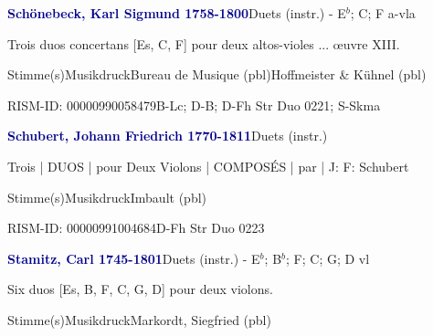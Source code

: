 \documentclass[twocolumn, 12pt]{book}
\begin{document}
\par \vspace{16pt} \textcolor{darkblue}{\textbf{Schönebeck, Karl Sigmund  1758-1800}}\hfillplus{\textbf{[328]}}\newline Duets (instr.) - E$^b$; C; F a-vla
\par \begin{itshape}Trois duos concertans [Es, C, F] pour deux altos-violes ... œuvre XIII.\end{itshape} 
\par \textcolor{darkblue}{}  Stimme(s)\newline Musikdruck\newline Bureau de Musique  (pbl)\newline Hoffmeister \& Kühnel  (pbl)
\par RISM-ID: 00000990058479\newline B-Lc; D-B; D-Fh  Str Duo 0221; S-Skma
\par \vspace{16pt} \textcolor{darkblue}{\textbf{Schubert, Johann Friedrich  1770-1811}}\hfillplus{\textbf{[329]}}\newline Duets (instr.)
\par \begin{itshape}Trois | DUOS | pour Deux Violons | COMPOSÉS | par | J: F: Schubert\end{itshape} 
\par \textcolor{darkblue}{}  Stimme(s)\newline Musikdruck\newline Imbault  (pbl)
\par RISM-ID: 00000991004684\newline D-Fh  Str Duo 0223
\par \vspace{16pt} \textcolor{darkblue}{\textbf{Stamitz, Carl  1745-1801}}\hfillplus{\textbf{[330]}}\newline Duets (instr.) - E$^b$; B$^b$; F; C; G; D vl
\par \begin{itshape}Six duos [Es, B, F, C, G, D] pour deux violons.\end{itshape} 
\par \textcolor{darkblue}{}  Stimme(s)\newline Musikdruck\newline Markordt, Siegfried  (pbl)
\end{document}
